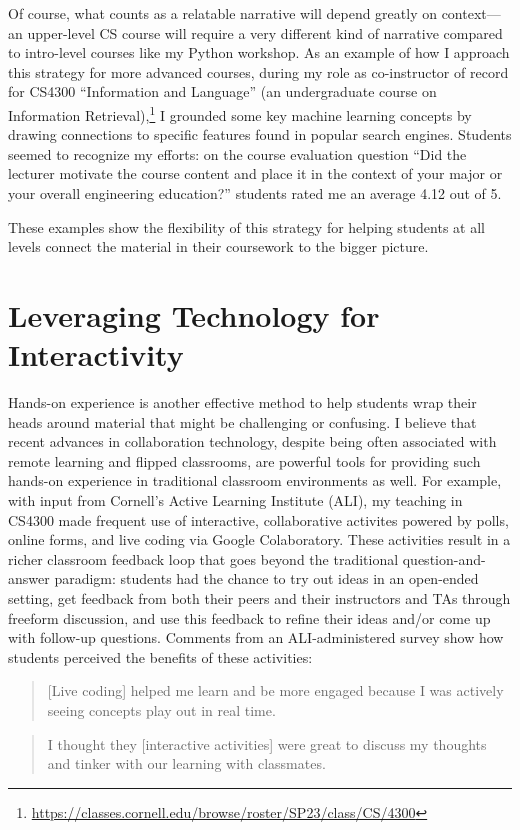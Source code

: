 \documentclass[12pt,letterpaper]{article}
\newcommand\narrativeendsent\lanarrativeend
\newcommand\narrativeendsent\gennarrativeend
\begin{document}
Of course, what counts as a relatable narrative will depend greatly on context---an upper-level CS course will require a very different kind of narrative compared to intro-level courses like my Python workshop.
As an example of how I approach this strategy for more advanced courses, during my role as co-instructor of record for CS4300 ``Information and Language'' (an undergraduate course on Information Retrieval),\footnote{\url{https://classes.cornell.edu/browse/roster/SP23/class/CS/4300}} I grounded some key machine learning concepts by drawing connections to specific features found in popular search engines.
Students seemed to recognize my efforts: on the course evaluation question ``Did the lecturer motivate the course content
and place it in the context of your major or your overall engineering
education?'' students rated me an average 4.12 out of 5.

These examples show the flexibility of this strategy for helping students at all levels connect the material in their coursework to the bigger picture.
\narrativeendsent

\section{Leveraging Technology for Interactivity}
Hands-on experience is another effective method to help students wrap their heads around material that might be challenging or confusing.
I believe that recent advances in collaboration technology, despite being often associated with remote learning and flipped classrooms, are powerful tools for providing such hands-on experience in traditional classroom environments as well.
For example, with input from Cornell's Active Learning Institute (ALI), my teaching in CS4300 made frequent use of interactive, collaborative activites powered by polls, online forms, and live coding via Google Colaboratory.
These activities result in a richer classroom feedback loop that goes beyond the traditional question-and-answer paradigm: students had the chance to try out ideas in an open-ended setting, get feedback from both their peers and their instructors and TAs through freeform discussion, and use this feedback to refine their ideas and/or come up with follow-up questions.
Comments from an ALI-administered survey show how students perceived the benefits of these activities:

\begin{quote}
    [Live coding] helped me learn and be more engaged because I was actively seeing concepts play out in real time.
\end{quote}
\begin{quote}
    I thought they [interactive activities] were great to discuss my thoughts and tinker with our learning with classmates.
\end{quote}
\end{document}
